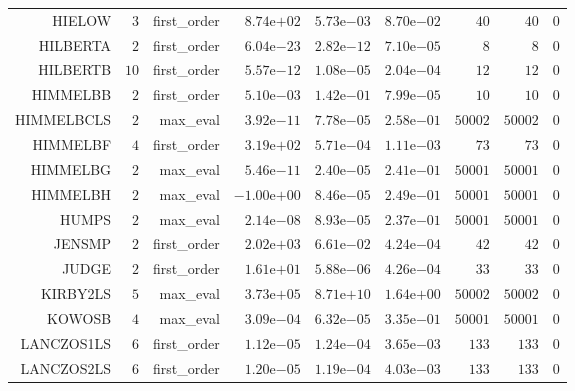 \begin{longtable}{rrrrrrrrr}
HIELOW & \(     3\) & first\_order & \( 8.74\)e\(+02\) & \( 5.73\)e\(-03\) & \( 8.70\)e\(-02\) & \(    40\) & \(    40\) & \(     0\) \\
HILBERTA & \(     2\) & first\_order & \( 6.04\)e\(-23\) & \( 2.82\)e\(-12\) & \( 7.10\)e\(-05\) & \(     8\) & \(     8\) & \(     0\) \\
HILBERTB & \(    10\) & first\_order & \( 5.57\)e\(-12\) & \( 1.08\)e\(-05\) & \( 2.04\)e\(-04\) & \(    12\) & \(    12\) & \(     0\) \\
HIMMELBB & \(     2\) & first\_order & \( 5.10\)e\(-03\) & \( 1.42\)e\(-01\) & \( 7.99\)e\(-05\) & \(    10\) & \(    10\) & \(     0\) \\
HIMMELBCLS & \(     2\) & max\_eval & \( 3.92\)e\(-11\) & \( 7.78\)e\(-05\) & \( 2.58\)e\(-01\) & \( 50002\) & \( 50002\) & \(     0\) \\
HIMMELBF & \(     4\) & first\_order & \( 3.19\)e\(+02\) & \( 5.71\)e\(-04\) & \( 1.11\)e\(-03\) & \(    73\) & \(    73\) & \(     0\) \\
HIMMELBG & \(     2\) & max\_eval & \( 5.46\)e\(-11\) & \( 2.40\)e\(-05\) & \( 2.41\)e\(-01\) & \( 50001\) & \( 50001\) & \(     0\) \\
HIMMELBH & \(     2\) & max\_eval & \(-1.00\)e\(+00\) & \( 8.46\)e\(-05\) & \( 2.49\)e\(-01\) & \( 50001\) & \( 50001\) & \(     0\) \\
HUMPS & \(     2\) & max\_eval & \( 2.14\)e\(-08\) & \( 8.93\)e\(-05\) & \( 2.37\)e\(-01\) & \( 50001\) & \( 50001\) & \(     0\) \\
JENSMP & \(     2\) & first\_order & \( 2.02\)e\(+03\) & \( 6.61\)e\(-02\) & \( 4.24\)e\(-04\) & \(    42\) & \(    42\) & \(     0\) \\
JUDGE & \(     2\) & first\_order & \( 1.61\)e\(+01\) & \( 5.88\)e\(-06\) & \( 4.26\)e\(-04\) & \(    33\) & \(    33\) & \(     0\) \\
KIRBY2LS & \(     5\) & max\_eval & \( 3.73\)e\(+05\) & \( 8.71\)e\(+10\) & \( 1.64\)e\(+00\) & \( 50002\) & \( 50002\) & \(     0\) \\
KOWOSB & \(     4\) & max\_eval & \( 3.09\)e\(-04\) & \( 6.32\)e\(-05\) & \( 3.35\)e\(-01\) & \( 50001\) & \( 50001\) & \(     0\) \\
LANCZOS1LS & \(     6\) & first\_order & \( 1.12\)e\(-05\) & \( 1.24\)e\(-04\) & \( 3.65\)e\(-03\) & \(   133\) & \(   133\) & \(     0\) \\
LANCZOS2LS & \(     6\) & first\_order & \( 1.20\)e\(-05\) & \( 1.19\)e\(-04\) & \( 4.03\)e\(-03\) & \(   133\) & \(   133\) & \(     0\) \\

\end{longtable}
